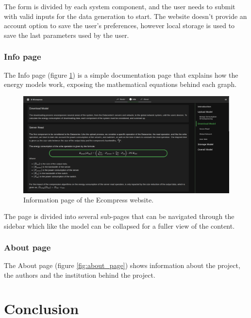         The form is divided by each system component, and the user needs to submit with valid inputs for the data generation to start. The website doesn't provide an account option to save the user's preferences, however local storage is used to save the last parameters used by the user. 

    \subsubsection{Info page}

        The Info page (figure \ref{fig:info_page}) is a simple documentation page that explains how the energy models work, exposing the mathematical equations behind each graph.

        \begin{figure}[H]
            \centering
            \includegraphics[width=1\textwidth]{figs/web_info_page.png}
            \caption{Information page of the Ecompress website.}
            \label{fig:info_page}
        \end{figure}

        The page is divided into several sub-pages that can be navigated through the sidebar which like the model can be collapsed for a fuller view of the content.

    \subsubsection{About page}

        The About page (figure \ref{fig:about_page}) shows information about the project, the authors and the institution behind the project. 


\section{Conclusion}

    